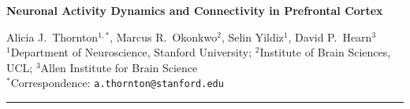 \documentclass[10pt]{article}
\begin{document}

\vspace*{5mm}

{\fontsize{12.5}{15}\bfseries\selectfont\color{accent!85!black}%
  Neuronal Activity Dynamics and Connectivity in Prefrontal Cortex%
}

\vspace{5pt}
{\small\color{black!60}
  Alicia J.\ Thornton$^{1,*}$,\enspace
  Marcus R.\ Okonkwo$^{2}$,\enspace
  Selin Yildiz$^{1}$,\enspace
  David P.\ Hearn$^{3}$\\[2pt]
  $^1$Department of Neuroscience, Stanford University;\enspace
  $^2$Institute of Brain Sciences, UCL;\enspace
  $^3$Allen Institute for Brain Science\\
  $^*$Correspondence: \texttt{a.thornton@stanford.edu}
}

\vspace{5pt}
{\color{ruleclr}\rule{\linewidth}{0.7pt}}
\vspace{3pt}
\end{document}
